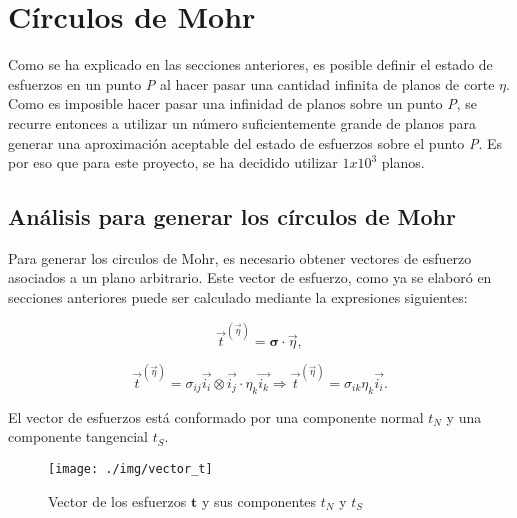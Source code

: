 \documentclass{article}
\begin{document}
    \section{Círculos de Mohr}
    Como se ha explicado en las secciones anteriores, es posible definir el estado de esfuerzos
    en un punto \textit{P} al hacer pasar una cantidad infinita de planos de corte $\eta$.
    Como es imposible hacer pasar una infinidad de planos sobre un punto \textit{P}, se recurre
    entonces a utilizar un n\'{u}mero suficientemente grande de planos para generar una
    aproximaci\'{o}n aceptable del estado de esfuerzos sobre el punto \textit{P}. Es por eso
    que para este proyecto, se ha decidido utilizar $1x10^3$ planos.

    \subsection{An\'{a}lisis para generar los círculos de Mohr}
    
    Para generar los circulos de Mohr, es necesario obtener vectores de esfuerzo asociados a
    un plano arbitrario. Este vector de esfuerzo, como ya se elabor\'{o} en secciones
    anteriores puede ser calculado mediante la expresiones siguientes:
    
    \begin{equation}
        \vec{t}^{(\vec{\eta})} = \bm{\sigma} \cdot \vec{\eta},
    \end{equation}

    \begin{equation}
        \vec{t}^{(\vec{\eta})} = \sigma_{ij}\vec{i_{i}}\otimes\vec{i_{j}}\cdot\eta_{k}\vec{i_{k}}
        \Longrightarrow
        \vec{t}^{(\vec{\eta})} = \sigma_{ik}\eta_{k}\vec{i_{i}}.
    \end{equation}

    El vector de esfuerzos est\'{a} conformado por una componente normal $t_{N}$ y una
    componente tangencial $t_{S}$. 
    
    \begin{figure}
        \centering
        \texttt{[image: ./img/vector\_t]}
        \caption{Vector de los esfuerzos $\bm{t}$ y sus componentes $t_{N}$ y $t_{S}$}
        \label{fig:vector_t}
    \end{figure}
\end{document}
